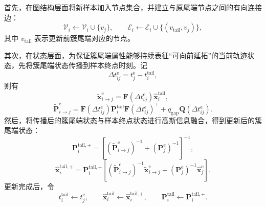 \documentclass{xdupgthesis}
\begin{document}
首先，在图结构层面将新样本加入节点集合，并建立与原尾端节点之间的有向连接边：
\begin{equation}
	\mathcal{V}_i \leftarrow \mathcal{V}_i \cup \{v_j\}, \qquad
	\mathcal{E}_i \leftarrow \mathcal{E}_i \cup \{(v_{\mathrm{tail}},v_j)\},
\end{equation}
其中 $v_{\mathrm{tail}}$ 表示更新前簇尾端对应的节点。

其次，在状态层面，为保证簇尾端属性能够持续表征“可向前延拓”的当前轨迹状态，先将簇尾端状态传播到样本终点时刻。记
\begin{equation}
	\Delta t_{ij}^{\mathrm{e}}=t_j^{\mathrm{e}}-t_i^{\mathrm{tail}},
\end{equation}
则有
\begin{equation}
	\tilde{\mathbf{x}}_{i\rightarrow j}^{\mathrm{e}}
	=
	\mathbf{F}(\Delta t_{ij}^{\mathrm{e}})\hat{\mathbf{x}}_i^{\mathrm{tail}},
\end{equation}
\begin{equation}
	\tilde{\mathbf{P}}_{i\rightarrow j}^{\mathrm{e}}
	=
	\mathbf{F}(\Delta t_{ij}^{\mathrm{e}})\mathbf{P}_i^{\mathrm{tail}}\mathbf{F}(\Delta t_{ij}^{\mathrm{e}})^{\top}
	+
	q_{\mathrm{gap}}\mathbf{Q}(\Delta t_{ij}^{\mathrm{e}}).
\end{equation}
然后，将传播后的簇尾端状态与样本终点状态进行高斯信息融合，得到更新后的簇尾端状态：
\begin{equation}
	\mathbf{P}_i^{\mathrm{tail},+}
	=
	\left[
	\left(\tilde{\mathbf{P}}_{i\rightarrow j}^{\mathrm{e}}\right)^{-1}
	+
	\left(\mathbf{P}_j^{\mathrm{e}}\right)^{-1}
	\right]^{-1},
\end{equation}
\begin{equation}
	\hat{\mathbf{x}}_i^{\mathrm{tail},+}
	=
	\mathbf{P}_i^{\mathrm{tail},+}
	\left[
	\left(\tilde{\mathbf{P}}_{i\rightarrow j}^{\mathrm{e}}\right)^{-1}
	\tilde{\mathbf{x}}_{i\rightarrow j}^{\mathrm{e}}
	+
	\left(\mathbf{P}_j^{\mathrm{e}}\right)^{-1}
	\hat{\mathbf{x}}_j^{\mathrm{e}}
	\right].
\end{equation}
更新完成后，令
\begin{equation}
	t_i^{\mathrm{tail}} \leftarrow t_j^{\mathrm{e}}, \qquad
	\hat{\mathbf{x}}_i^{\mathrm{tail}} \leftarrow \hat{\mathbf{x}}_i^{\mathrm{tail},+}, \qquad
	\mathbf{P}_i^{\mathrm{tail}} \leftarrow \mathbf{P}_i^{\mathrm{tail},+}.
\end{equation}
\end{document}
